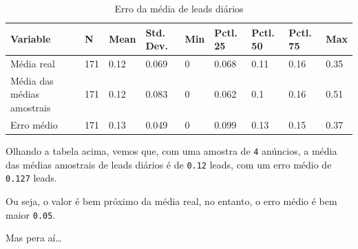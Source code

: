 \documentclass[
]{article}
\newenvironment{Shaded}{\begin{snugshade}}{\end{snugshade}}
\newcommand{\AttributeTok}[1]{\textcolor[rgb]{0.13,0.29,0.53}{#1}}
\newcommand{\FunctionTok}[1]{\textcolor[rgb]{0.13,0.29,0.53}{\textbf{#1}}}
\newcommand{\NormalTok}[1]{#1}
\newcommand{\OtherTok}[1]{\textcolor[rgb]{0.56,0.35,0.01}{#1}}
\newcommand{\SpecialCharTok}[1]{\textcolor[rgb]{0.81,0.36,0.00}{\textbf{#1}}}
\newcommand{\StringTok}[1]{\textcolor[rgb]{0.31,0.60,0.02}{#1}}
\begin{document}
\begin{Shaded}
\end{Shaded}

\begin{table}

\caption{\label{tab:unnamed-chunk-13}Erro da média de leads diários}
\centering
\begin{tabular}[t]{lllllllll}
\toprule
Variable & N & Mean & Std. Dev. & Min & Pctl. 25 & Pctl. 50 & Pctl. 75 & Max\\
\midrule
Média real & 171 & 0.12 & 0.069 & 0 & 0.068 & 0.11 & 0.16 & 0.35\\
Média das médias amostrais & 171 & 0.12 & 0.083 & 0 & 0.062 & 0.1 & 0.16 & 0.51\\
Erro médio & 171 & 0.13 & 0.049 & 0 & 0.099 & 0.13 & 0.15 & 0.37\\
\bottomrule
\end{tabular}
\end{table}

Olhando a tabela acima, vemos que, com uma amostra de \texttt{4}
anúncios, a média das médias amostrais de leads diários é de
\texttt{0.12} leads, com um erro médio de \texttt{0.127} leads.

Ou seja, o valor é bem próximo da média real, no entanto, o erro médio é
bem maior \texttt{0.05}.

Mas pera aí\ldots{}
\end{document}
